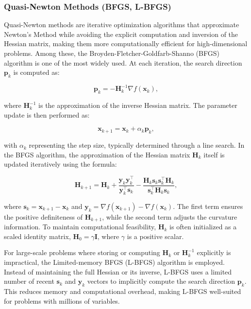 \subsubsection{Quasi-Newton Methods (BFGS, L-BFGS)}
\label{subsubsection:quasi_newton}
Quasi-Newton methods are iterative optimization algorithms that approximate Newton's Method while avoiding the explicit computation and inversion of the Hessian matrix, making them more computationally efficient for high-dimensional problems. Among these, the Broyden-Fletcher-Goldfarb-Shanno (BFGS) algorithm is one of the most widely used. At each iteration, the search direction $\mathbf{p}_k$ is computed as:

\begin{equation*}
\mathbf{p}_k = -\mathbf{H}_k^{-1} \nabla f(\mathbf{x}_k),
\end{equation*}

\noindent where $\mathbf{H}_k^{-1}$ is the approximation of the inverse Hessian matrix. The parameter update is then performed as:

\begin{equation*}
\mathbf{x}_{k+1} = \mathbf{x}_k + \alpha_k \mathbf{p}_k,
\end{equation*}

\noindent with $\alpha_k$ representing the step size, typically determined through a line search. In the BFGS algorithm, the approximation of the Hessian matrix $\mathbf{H}_k$ itself is updated iteratively using the formula:

\begin{equation*}
\mathbf{H}_{k+1} = \mathbf{H}_k 
+ \frac{\mathbf{y}_k \mathbf{y}_k^\top}{\mathbf{y}_k^\top \mathbf{s}_k} 
- \frac{\mathbf{H}_k \mathbf{s}_k \mathbf{s}_k^\top \mathbf{H}_k}{\mathbf{s}_k^\top \mathbf{H}_k \mathbf{s}_k},
\end{equation*}

\noindent where $\mathbf{s}_k = \mathbf{x}_{k+1} - \mathbf{x}_k$ and $\mathbf{y}_k = \nabla f(\mathbf{x}_{k+1}) - \nabla f(\mathbf{x}_k)$. The first term ensures the positive definiteness of $\mathbf{H}_{k+1}$, while the second term adjusts the curvature information. To maintain computational feasibility, $\mathbf{H}_k$ is often initialized as a scaled identity matrix, $\mathbf{H}_0 = \gamma \mathbf{I}$, where $\gamma$ is a positive scalar.

For large-scale problems where storing or computing $\mathbf{H}_k$ or $\mathbf{H}_k^{-1}$ explicitly is impractical, the Limited-memory BFGS (L-BFGS) algorithm is employed. Instead of maintaining the full Hessian or its inverse, L-BFGS uses a limited number of recent $\mathbf{s}_k$ and $\mathbf{y}_k$ vectors to implicitly compute the search direction $\mathbf{p}_k$. This reduces memory and computational overhead, making L-BFGS well-suited for problems with millions of variables.

